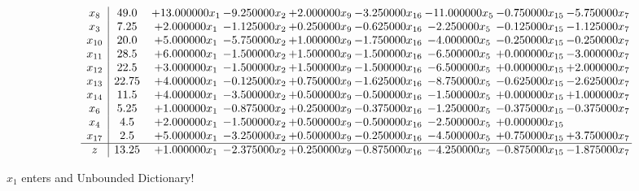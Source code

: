 \documentclass[10pt]{article}
\begin{document}
 \[\begin{array}{c| c c@{\hskip 2pt} c@{\hskip 2pt} c@{\hskip 2pt} c@{\hskip 2pt} c@{\hskip 2pt} c@{\hskip 2pt} c@{\hskip 2pt} }
 x_{8}   &  49.0 & + 13.000000 x_{1} & -9.250000 x_{2} & + 2.000000 x_{9} & -3.250000 x_{16} & -11.000000 x_{5} & -0.750000 x_{15} & -5.750000 x_{7}\\
 x_{3}   &  7.25 & + 2.000000 x_{1} & -1.125000 x_{2} & + 0.250000 x_{9} & -0.625000 x_{16} & -2.250000 x_{5} & -0.125000 x_{15} & -1.125000 x_{7}\\
 x_{10}   &  20.0 & + 5.000000 x_{1} & -5.750000 x_{2} & + 1.000000 x_{9} & -1.750000 x_{16} & -4.000000 x_{5} & -0.250000 x_{15} & -0.250000 x_{7}\\
 x_{11}   &  28.5 & + 6.000000 x_{1} & -1.500000 x_{2} & + 1.500000 x_{9} & -1.500000 x_{16} & -6.500000 x_{5} & + 0.000000 x_{15} & -3.000000 x_{7}\\
 x_{12}   &  22.5 & + 3.000000 x_{1} & -1.500000 x_{2} & + 1.500000 x_{9} & -1.500000 x_{16} & -6.500000 x_{5} & + 0.000000 x_{15} & + 2.000000 x_{7}\\
 x_{13}   &  22.75 & + 4.000000 x_{1} & -0.125000 x_{2} & + 0.750000 x_{9} & -1.625000 x_{16} & -8.750000 x_{5} & -0.625000 x_{15} & -2.625000 x_{7}\\
 x_{14}   &  11.5 & + 4.000000 x_{1} & -3.500000 x_{2} & + 0.500000 x_{9} & -0.500000 x_{16} & -1.500000 x_{5} & + 0.000000 x_{15} & + 1.000000 x_{7}\\
 x_{6}   &  5.25 & + 1.000000 x_{1} & -0.875000 x_{2} & + 0.250000 x_{9} & -0.375000 x_{16} & -1.250000 x_{5} & -0.375000 x_{15} & -0.375000 x_{7}\\
 x_{4}   &  4.5 & + 2.000000 x_{1} & -1.500000 x_{2} & + 0.500000 x_{9} & -0.500000 x_{16} & -2.500000 x_{5} & + 0.000000 x_{15} &   \\
 x_{17}   &  2.5 & + 5.000000 x_{1} & -3.250000 x_{2} & + 0.500000 x_{9} & -0.250000 x_{16} & -4.500000 x_{5} & + 0.750000 x_{15} & + 3.750000 x_{7}\\
\hline
z    &  13.25 & + 1.000000 x_{1} & -2.375000 x_{2} & + 0.250000 x_{9} & -0.875000 x_{16} & -4.250000 x_{5} & -0.875000 x_{15} & -1.875000 x_{7}\\
\end{array}\]


 $ x_{1} $ enters and Unbounded Dictionary!
\end{document}
